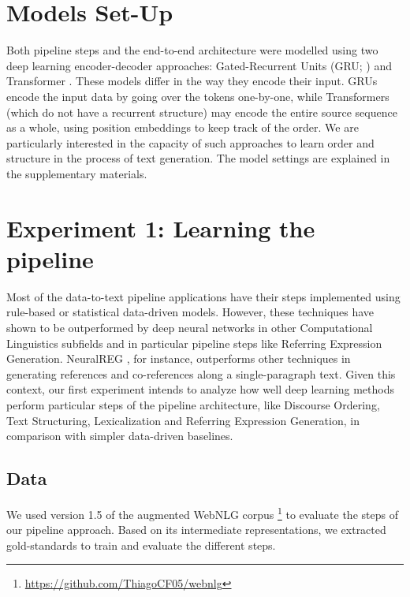 \documentclass[11pt,a4paper]{article}
\begin{document}
\section{Models Set-Up}




Both pipeline steps and the end-to-end architecture were modelled using two deep learning encoder-decoder approaches: Gated-Recurrent Units (GRU; \citealt{choetal2014b}) and Transformer \cite{vaswani2017}. These models differ in the way they encode their input. GRUs encode the input data by going over the tokens one-by-one, while Transformers (which do not have a recurrent structure) may encode the entire source sequence as a whole, using position embeddings to keep track of the order. We are particularly interested in the capacity of such approaches to learn order and structure in the process of text generation. The model settings are explained in the supplementary materials.

\section{Experiment 1: Learning the pipeline}

Most of the data-to-text pipeline applications have their steps implemented using rule-based or statistical data-driven models. However, these techniques have shown to be outperformed by deep neural networks in other Computational Linguistics subfields and in particular pipeline steps like Referring Expression Generation. NeuralREG \cite{ferreira2018}, for instance, outperforms other techniques in generating references and co-references along a single-paragraph text. 
Given this context, our first experiment intends to analyze how well deep learning methods perform particular steps of the pipeline architecture, like Discourse Ordering, Text Structuring, Lexicalization and Referring Expression Generation, in comparison with simpler data-driven baselines.

\subsection{Data} 
We used version 1.5 of the augmented WebNLG corpus \cite{ferreira2018b}\footnote{\url{https://github.com/ThiagoCF05/webnlg}} to evaluate the steps of our pipeline approach. Based on its intermediate representations, we extracted gold-standards to train and evaluate the different steps.
\end{document}
